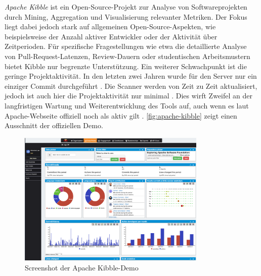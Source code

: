 \textit{Apache Kibble} ist ein Open-Source-Projekt zur Analyse von Softwareprojekten durch Mining, Aggregation und Visualisierung relevanter Metriken. Der Fokus liegt dabei jedoch stark auf allgemeinen Open-Source-Aspekten, wie beispielsweise der Anzahl aktiver Entwickler oder der Aktivität über Zeitperioden. Für spezifische Fragestellungen wie etwa die detaillierte Analyse von Pull-Request-Latenzen, Review-Dauern oder studentischen Arbeitsmustern bietet Kibble nur begrenzte Unterstützung. Ein weiterer Schwachpunkt ist die geringe Projektaktivität. In den letzten zwei Jahren wurde für den Server nur ein einziger Commit durchgeführt \parencite{noauthor_apachekibble-1_2025}. Die Scanner werden von Zeit zu Zeit aktualisiert, jedoch ist auch hier die Projektaktivität nur minimal \parencite{noauthor_apachekibble-scanners_2024}. Dies wirft Zweifel an der langfristigen Wartung und Weiterentwicklung des Tools auf, auch wenn es laut Apache-Webseite offiziell noch als aktiv gilt \parencite{noauthor_apache_nodate}. \autoref{fig:apache-kibble} zeigt einen Ausschnitt der offiziellen Demo. \parencite{sally_apache_2018} \parencite{noauthor_setting_nodate}
\begin{figure}[htbp]
    \centering
    \includegraphics[width=0.8\textwidth]{Figures/apache-kibble.png}
    \caption{Screenshot der Apache Kibble-Demo \parencite{noauthor_code_nodate}}
    \label{fig:apache-kibble}
\end{figure}

